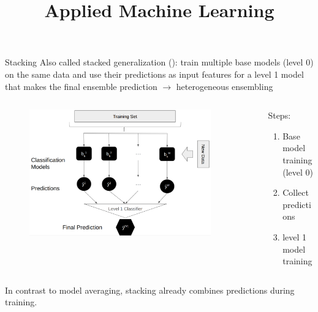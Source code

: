 \documentclass[11pt,compress,t,notes=noshow, xcolor=table]{beamer}
\title{Applied Machine Learning}
\date{}
\begin{document}


\begin{vbframe}{Stacking}
Also called stacked generalization (): train multiple base models (level 0) on the same data and use their predictions as input features for a level 1 model that makes the final ensemble prediction $\rightarrow$ heterogeneous ensembling
\vspace{1em}
\begin{columns}
    \begin{column}{0.5\textwidth}
        \vspace{-1em}
        \begin{figure}
            \centering
            \includegraphics[width=0.9\textwidth]{figure/stacking_better.png}
            \label{fig:stacking}
        \end{figure}
    \end{column}
    \begin{column}{0.5\textwidth}
        Steps:
        \begin{enumerate}
            \item Base model training (level 0)
            \item Collect predictions
            \item level 1 model training
        \end{enumerate}
    \end{column}
\end{columns}
\vspace{1em}

In contrast to model averaging, stacking already combines predictions during training.

\end{vbframe}
\end{document}
